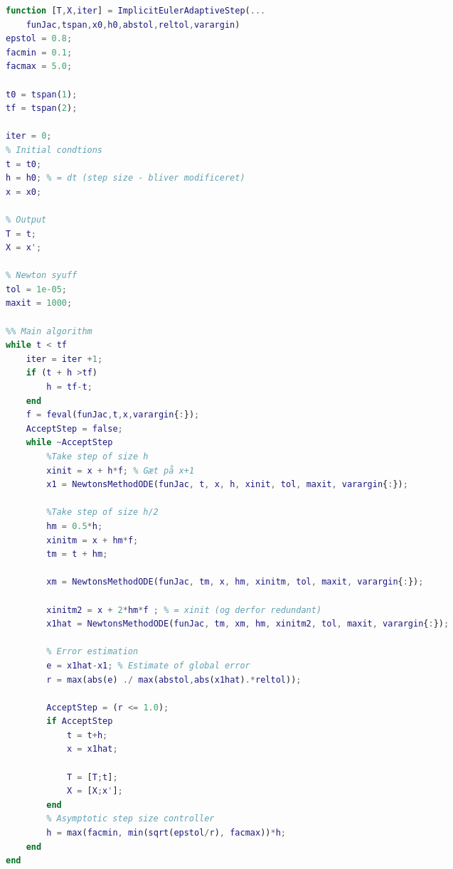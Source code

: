 \begin{adjustwidth*}{0cm}{-0.4cm}
\begin{lstlisting}[frame=single, language=Matlab,caption=Implicit Euler (adaptive step size), label=ExplicitEulerFixie]
function [T,X,iter] = ImplicitEulerAdaptiveStep(...
    funJac,tspan,x0,h0,abstol,reltol,varargin)
epstol = 0.8;
facmin = 0.1;
facmax = 5.0;

t0 = tspan(1);
tf = tspan(2);

iter = 0;
% Initial condtions
t = t0;
h = h0; % = dt (step size - bliver modificeret)
x = x0;

% Output
T = t;
X = x';

% Newton syuff
tol = 1e-05;
maxit = 1000;

%% Main algorithm
while t < tf
    iter = iter +1;
    if (t + h >tf)
        h = tf-t;
    end
    f = feval(funJac,t,x,varargin{:});
    AcceptStep = false;
    while ~AcceptStep
        %Take step of size h
        xinit = x + h*f; % Gæt på x+1
        x1 = NewtonsMethodODE(funJac, t, x, h, xinit, tol, maxit, varargin{:});

        %Take step of size h/2
        hm = 0.5*h;
        xinitm = x + hm*f;
        tm = t + hm;

        xm = NewtonsMethodODE(funJac, tm, x, hm, xinitm, tol, maxit, varargin{:});
        
        xinitm2 = x + 2*hm*f ; % = xinit (og derfor redundant)
        x1hat = NewtonsMethodODE(funJac, tm, xm, hm, xinitm2, tol, maxit, varargin{:});

        % Error estimation
        e = x1hat-x1; % Estimate of global error
        r = max(abs(e) ./ max(abstol,abs(x1hat).*reltol));

        AcceptStep = (r <= 1.0);
        if AcceptStep
            t = t+h;
            x = x1hat;

            T = [T;t];
            X = [X;x'];
        end
        % Asymptotic step size controller
        h = max(facmin, min(sqrt(epstol/r), facmax))*h;
    end
end
\end{lstlisting}
\end{adjustwidth*}











